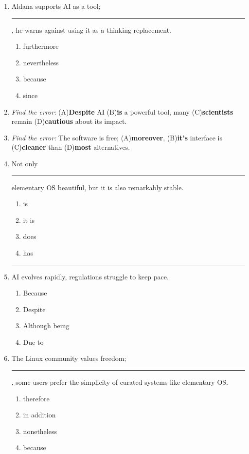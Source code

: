 \documentclass[10pt,a4paper]{article}
\begin{document}
\begin{enumerate}[label=\textbf{\arabic*.}, leftmargin=*]
\item Aldana supports AI as a tool; \rule{2cm}{0.4pt}, he warns
against using it as a thinking replacement.
\begin{enumerate}[label=(\Alph*)]
\item furthermore \item nevertheless \item because \item since
\end{enumerate}

\item \textit{Find the error:}
(A)\textbf{Despite} AI (B)\textbf{is} a powerful tool, many
(C)\textbf{scientists} remain (D)\textbf{cautious} about its impact.

\item \textit{Find the error:}
The software is free; (A)\textbf{moreover}, (B)\textbf{it's}
interface is (C)\textbf{cleaner} than (D)\textbf{most} alternatives.

\item Not only \rule{2cm}{0.4pt} elementary OS beautiful, but it is
also remarkably stable.
\begin{enumerate}[label=(\Alph*)]
\item is \item it is \item does \item has
\end{enumerate}

\item \rule{2cm}{0.4pt} AI evolves rapidly, regulations struggle to
keep pace.
\begin{enumerate}[label=(\Alph*)]
\item Because \item Despite \item Although being \item Due to
\end{enumerate}

\item The Linux community values freedom; \rule{2cm}{0.4pt}, some
users prefer the simplicity of curated systems like elementary OS.
\begin{enumerate}[label=(\Alph*)]
\item therefore \item in addition \item nonetheless \item because
\end{enumerate}
\end{enumerate}
\end{document}
